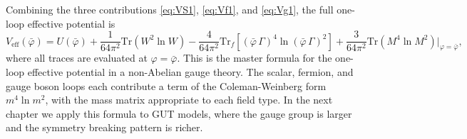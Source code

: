 Combining the three contributions \eqref{eq:VS1}, \eqref{eq:Vf1}, and
\eqref{eq:Vg1}, the full one-loop effective potential is
\begin{equation}
    V_{\text{eff}}(\bar\varphi) = U(\bar\varphi)
    + \frac{1}{64\pi^2}\mathrm{Tr}(W^2\ln W)
    - \frac{4}{64\pi^2}\mathrm{Tr}_f
    \!\left[(\bar\varphi\,\Gamma)^4\ln(\bar\varphi\,\Gamma)^2\right]
    + \frac{3}{64\pi^2}\mathrm{Tr}(M^4\ln M^2)\big|_{\varphi=\bar\varphi},
\end{equation}
where all traces are evaluated at $\varphi = \bar\varphi$. This is the
master formula for the one-loop effective potential in a non-Abelian
gauge theory. The scalar, fermion, and gauge boson loops each contribute
a term of the Coleman-Weinberg form $m^4\ln m^2$, with the mass matrix
appropriate to each field type. In the next chapter we apply this formula
to GUT models, where the gauge group is larger and the symmetry breaking
pattern is richer.
